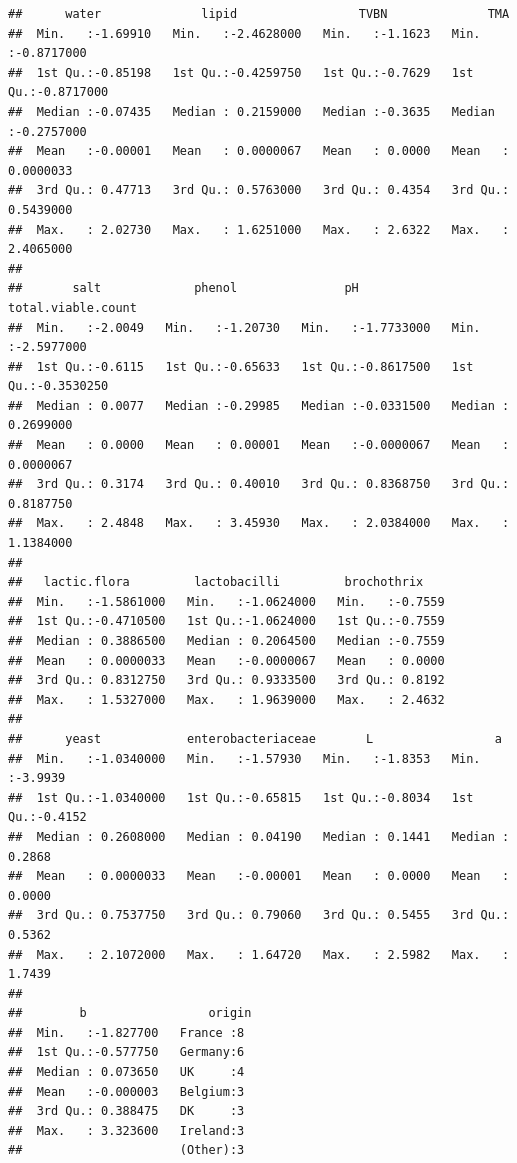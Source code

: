 \documentclass[
]{book}
\begin{document}
\begin{verbatim}
##      water              lipid                 TVBN              TMA            
##  Min.   :-1.69910   Min.   :-2.4628000   Min.   :-1.1623   Min.   :-0.8717000  
##  1st Qu.:-0.85198   1st Qu.:-0.4259750   1st Qu.:-0.7629   1st Qu.:-0.8717000  
##  Median :-0.07435   Median : 0.2159000   Median :-0.3635   Median :-0.2757000  
##  Mean   :-0.00001   Mean   : 0.0000067   Mean   : 0.0000   Mean   : 0.0000033  
##  3rd Qu.: 0.47713   3rd Qu.: 0.5763000   3rd Qu.: 0.4354   3rd Qu.: 0.5439000  
##  Max.   : 2.02730   Max.   : 1.6251000   Max.   : 2.6322   Max.   : 2.4065000  
##                                                                                
##       salt             phenol               pH             total.viable.count  
##  Min.   :-2.0049   Min.   :-1.20730   Min.   :-1.7733000   Min.   :-2.5977000  
##  1st Qu.:-0.6115   1st Qu.:-0.65633   1st Qu.:-0.8617500   1st Qu.:-0.3530250  
##  Median : 0.0077   Median :-0.29985   Median :-0.0331500   Median : 0.2699000  
##  Mean   : 0.0000   Mean   : 0.00001   Mean   :-0.0000067   Mean   : 0.0000067  
##  3rd Qu.: 0.3174   3rd Qu.: 0.40010   3rd Qu.: 0.8368750   3rd Qu.: 0.8187750  
##  Max.   : 2.4848   Max.   : 3.45930   Max.   : 2.0384000   Max.   : 1.1384000  
##                                                                                
##   lactic.flora         lactobacilli         brochothrix     
##  Min.   :-1.5861000   Min.   :-1.0624000   Min.   :-0.7559  
##  1st Qu.:-0.4710500   1st Qu.:-1.0624000   1st Qu.:-0.7559  
##  Median : 0.3886500   Median : 0.2064500   Median :-0.7559  
##  Mean   : 0.0000033   Mean   :-0.0000067   Mean   : 0.0000  
##  3rd Qu.: 0.8312750   3rd Qu.: 0.9333500   3rd Qu.: 0.8192  
##  Max.   : 1.5327000   Max.   : 1.9639000   Max.   : 2.4632  
##                                                             
##      yeast            enterobacteriaceae       L                 a          
##  Min.   :-1.0340000   Min.   :-1.57930   Min.   :-1.8353   Min.   :-3.9939  
##  1st Qu.:-1.0340000   1st Qu.:-0.65815   1st Qu.:-0.8034   1st Qu.:-0.4152  
##  Median : 0.2608000   Median : 0.04190   Median : 0.1441   Median : 0.2868  
##  Mean   : 0.0000033   Mean   :-0.00001   Mean   : 0.0000   Mean   : 0.0000  
##  3rd Qu.: 0.7537750   3rd Qu.: 0.79060   3rd Qu.: 0.5455   3rd Qu.: 0.5362  
##  Max.   : 2.1072000   Max.   : 1.64720   Max.   : 2.5982   Max.   : 1.7439  
##                                                                             
##        b                 origin 
##  Min.   :-1.827700   France :8  
##  1st Qu.:-0.577750   Germany:6  
##  Median : 0.073650   UK     :4  
##  Mean   :-0.000003   Belgium:3  
##  3rd Qu.: 0.388475   DK     :3  
##  Max.   : 3.323600   Ireland:3  
##                      (Other):3
\end{verbatim}
\end{document}
